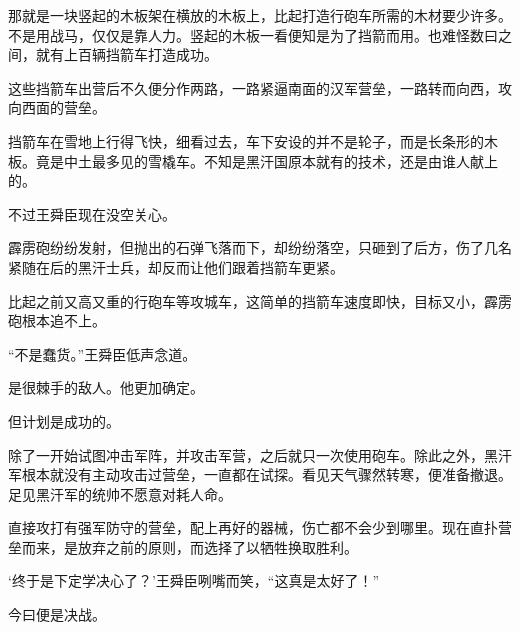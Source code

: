 那就是一块竖起的木板架在横放的木板上，比起打造行砲车所需的木材要少许多。不是用战马，仅仅是靠人力。竖起的木板一看便知是为了挡箭而用。也难怪数曰之间，就有上百辆挡箭车打造成功。

这些挡箭车出营后不久便分作两路，一路紧逼南面的汉军营垒，一路转而向西，攻向西面的营垒。

挡箭车在雪地上行得飞快，细看过去，车下安设的并不是轮子，而是长条形的木板。竟是中土最多见的雪橇车。不知是黑汗国原本就有的技术，还是由谁人献上的。

不过王舜臣现在没空关心。

霹雳砲纷纷发射，但抛出的石弹飞落而下，却纷纷落空，只砸到了后方，伤了几名紧随在后的黑汗士兵，却反而让他们跟着挡箭车更紧。

比起之前又高又重的行砲车等攻城车，这简单的挡箭车速度即快，目标又小，霹雳砲根本追不上。

“不是蠢货。”王舜臣低声念道。

是很棘手的敌人。他更加确定。

但计划是成功的。

除了一开始试图冲击军阵，并攻击军营，之后就只一次使用砲车。除此之外，黑汗军根本就没有主动攻击过营垒，一直都在试探。看见天气骤然转寒，便准备撤退。足见黑汗军的统帅不愿意对耗人命。

直接攻打有强军防守的营垒，配上再好的器械，伤亡都不会少到哪里。现在直扑营垒而来，是放弃之前的原则，而选择了以牺牲换取胜利。

‘终于是下定学决心了？’王舜臣咧嘴而笑，“这真是太好了！”

今曰便是决战。
